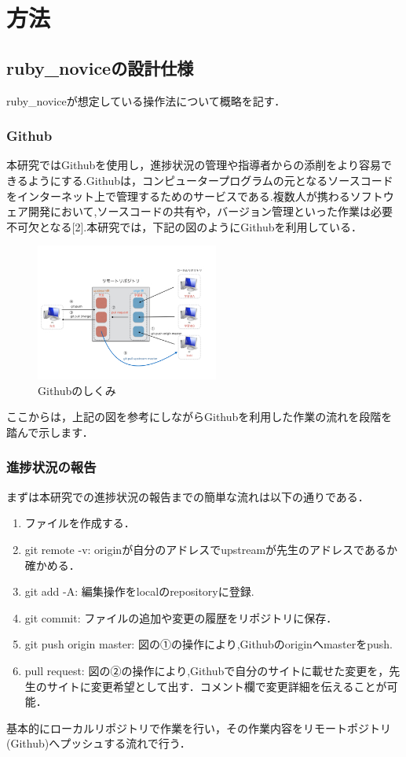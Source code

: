 \section{方法}
\subsection{ruby\_noviceの設計仕様}
ruby\_noviceが想定している操作法について概略を記す．

\subsubsection{Github}
本研究ではGithubを使用し，進捗状況の管理や指導者からの添削をより容易できるようにする.Githubは，コンピュータープログラムの元となるソースコードをインターネット上で管理するためのサービスである.複数人が携わるソフトウェア開発において,ソースコードの共有や，バージョン管理といった作業は必要不可欠となる[2].本研究では，下記の図のようにGithubを利用している．

\begin{figure}[htbp]\begin{center}
\includegraphics[width=6cm,bb=0 0 442 432]{../figs/./ruby_novice.002.jpg}
\caption{Githubのしくみ}
\label{default}\end{center}\end{figure}
ここからは，上記の図を参考にしながらGithubを利用した作業の流れを段階を踏んで示します．

\subsubsection{進捗状況の報告}
まずは本研究での進捗状況の報告までの簡単な流れは以下の通りである．

\begin{enumerate}
\item ファイルを作成する．
\item git remote -v: originが自分のアドレスでupstreamが先生のアドレスであるか確かめる．
\item git add -A: 編集操作をlocalのrepositoryに登録.
\item git commit: ファイルの追加や変更の履歴をリポジトリに保存．
\item git push origin master: 図の①の操作により,Githubのoriginへmasterをpush.
\item pull request: 図の②の操作により,Githubで自分のサイトに載せた変更を，先生のサイトに変更希望として出す．コメント欄で変更詳細を伝えることが可能．
\end{enumerate}
基本的にローカルリポジトリで作業を行い，その作業内容をリモートポジトリ(Github)へプッシュする流れで行う．


